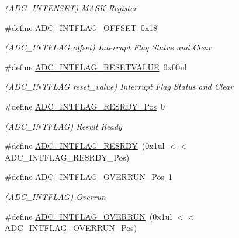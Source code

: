 \begin{DoxyCompactItemize}
\begin{DoxyCompactList}\small\item\em (A\+D\+C\+\_\+\+I\+N\+T\+E\+N\+S\+ET) M\+A\+SK Register \end{DoxyCompactList}\item 
\#define \mbox{\hyperlink{group___s_a_m_d21___a_d_c_gafd3a9b4fec2824771e0a977b66bf9403}{A\+D\+C\+\_\+\+I\+N\+T\+F\+L\+A\+G\+\_\+\+O\+F\+F\+S\+ET}}~0x18
\begin{DoxyCompactList}\small\item\em (A\+D\+C\+\_\+\+I\+N\+T\+F\+L\+AG offset) Interrupt Flag Status and Clear \end{DoxyCompactList}\item 
\#define \mbox{\hyperlink{group___s_a_m_d21___a_d_c_ga834970e3bd57aba06d98614a474f4674}{A\+D\+C\+\_\+\+I\+N\+T\+F\+L\+A\+G\+\_\+\+R\+E\+S\+E\+T\+V\+A\+L\+UE}}~0x00ul
\begin{DoxyCompactList}\small\item\em (A\+D\+C\+\_\+\+I\+N\+T\+F\+L\+AG reset\+\_\+value) Interrupt Flag Status and Clear \end{DoxyCompactList}\item 
\#define \mbox{\hyperlink{group___s_a_m_d21___a_d_c_gaceaa92b773ddec31eebac84ace833e60}{A\+D\+C\+\_\+\+I\+N\+T\+F\+L\+A\+G\+\_\+\+R\+E\+S\+R\+D\+Y\+\_\+\+Pos}}~0
\begin{DoxyCompactList}\small\item\em (A\+D\+C\+\_\+\+I\+N\+T\+F\+L\+AG) Result Ready \end{DoxyCompactList}\item 
\#define \mbox{\hyperlink{group___s_a_m_d21___a_d_c_ga4ae8ec126f3771d5bbc4efce93cacf9c}{A\+D\+C\+\_\+\+I\+N\+T\+F\+L\+A\+G\+\_\+\+R\+E\+S\+R\+DY}}~(0x1ul $<$$<$ A\+D\+C\+\_\+\+I\+N\+T\+F\+L\+A\+G\+\_\+\+R\+E\+S\+R\+D\+Y\+\_\+\+Pos)
\item 
\#define \mbox{\hyperlink{group___s_a_m_d21___a_d_c_gae42501968146288809110683854b38d5}{A\+D\+C\+\_\+\+I\+N\+T\+F\+L\+A\+G\+\_\+\+O\+V\+E\+R\+R\+U\+N\+\_\+\+Pos}}~1
\begin{DoxyCompactList}\small\item\em (A\+D\+C\+\_\+\+I\+N\+T\+F\+L\+AG) Overrun \end{DoxyCompactList}\item 
\#define \mbox{\hyperlink{group___s_a_m_d21___a_d_c_gac87b52c32998b04f2cb3f202abb818b4}{A\+D\+C\+\_\+\+I\+N\+T\+F\+L\+A\+G\+\_\+\+O\+V\+E\+R\+R\+UN}}~(0x1ul $<$$<$ A\+D\+C\+\_\+\+I\+N\+T\+F\+L\+A\+G\+\_\+\+O\+V\+E\+R\+R\+U\+N\+\_\+\+Pos)
\item 

\end{DoxyCompactItemize}
